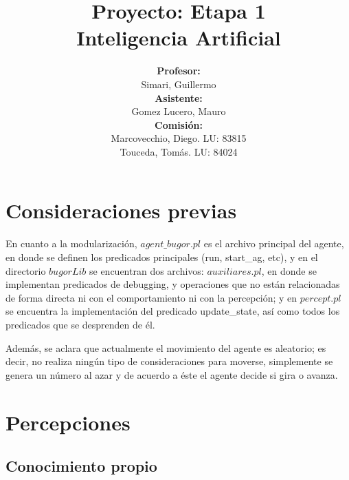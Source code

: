 \documentclass[a4paper,10pt,spanish]{article}
\begin{document}
\begin{titlepage}

\title{{\bf Proyecto: Etapa 1}\\ Inteligencia Artificial\vspace{10mm}}
\author{{\bf Profesor:}\\ Simari, Guillermo\\
{\bf Asistente:}\\ Gomez Lucero, Mauro\\
{\bf Comisi\'on:}\\ Marcovecchio, Diego. LU: 83815\\ Touceda, Tom\'as. LU: 84024}
\date{}

\maketitle

\thispagestyle{empty}

\end{titlepage}

\newpage

\tableofcontents

\newpage

\section{Consideraciones previas}

	En cuanto a la modularizaci\'on, $agent\_bugor.pl$ es el archivo principal del agente, en donde se definen los predicados principales (run, start\_ag, etc), y en el directorio $bugorLib$ se encuentran dos archivos: $auxiliares.pl$, en donde se implementan predicados de debugging, y operaciones que no est\'an relacionadas de forma directa ni con el comportamiento ni con la percepci\'on; y en $percept.pl$ se encuentra la implementaci\'on del predicado update\_state, as\'i como todos los predicados que se desprenden de \'el.

	Adem\'as, se aclara que actualmente el movimiento del agente es aleatorio; es decir, no realiza ning\'un tipo de consideraciones para moverse, simplemente se genera un n\'umero al azar y de acuerdo a \'este el agente decide si gira o avanza.

\section{Percepciones}
	\subsection{Conocimiento propio}
	
\end{document}
